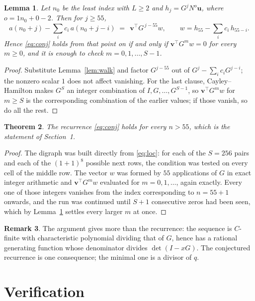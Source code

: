 \documentclass[11pt,a4paper]{article}
\theoremstyle{plain}
\newtheorem{theorem}{Theorem}
\newtheorem{lemma}[theorem]{Lemma}
\theoremstyle{definition}
\newtheorem{remark}[theorem]{Remark}
\begin{document}
\begin{lemma}\label{lem:crit}
Let $n_0$ be the least index with $L\ge2$ and $h_j=G^{j}N^{o}\mathbf{u}$, where
$o=1n_0+0-2$. Then for $j\ge55$,
\[
a(n_0+j)-\sum_i c_i\,a(n_0+j-i)\;=\;\,\mathbf{v}^{\!\top}G^{\,j-55}w,
\qquad w=h_{55}-\sum_i c_i\,h_{55-i} .
\]
Hence \eqref{eq:conj} holds from that point on if and only if
$\mathbf{v}^{\!\top}G^{m}w=0$ for every $m\ge0$, and it is enough to check
$m=0,1,\dots,S-1$.
\end{lemma}

\begin{proof}
Substitute Lemma~\ref{lem:walk} and factor $G^{j-55}$ out of
$G^{j}-\sum_ic_iG^{j-i}$; the nonzero scalar $1$ does not affect
vanishing. For the last clause, Cayley--Hamilton makes $G^{S}$ an integer combination of
$I,G,\dots,G^{S-1}$, so $\mathbf{v}^{\!\top}G^{m}w$ for $m\ge S$ is the corresponding
combination of the earlier values; if those vanish, so do all the rest.
\end{proof}

\begin{theorem}
The recurrence \eqref{eq:conj} holds for every $n>55$, which is the statement of
Section~1.
\end{theorem}

\begin{proof}
The digraph was built directly from \eqref{eq:loc}: for each of the $S=256$ pairs and each
of the $(1+1)^{8}$ possible next rows, the condition was tested on every cell of
the middle row. The vector $w$ was formed by $55$ applications of $G$ in exact integer
arithmetic and $\mathbf{v}^{\!\top}G^{m}w$ evaluated for $m=0,1,\dots$, again exactly.
Every one of those integers vanishes from the index corresponding to $n=55+1$ onwards,
and the run was continued until $S+1$ consecutive zeros had been seen, which by
Lemma~\ref{lem:crit} settles every larger $m$ at once.
\end{proof}

\begin{remark}
The argument gives more than the recurrence: the sequence is $C$-finite with characteristic
polynomial dividing that of $G$, hence has a rational generating function whose denominator
divides $\det(I-xG)$. The conjectured recurrence is one consequence; the minimal one is a
divisor of $q$.
\end{remark}

\section{Verification}
\end{document}
